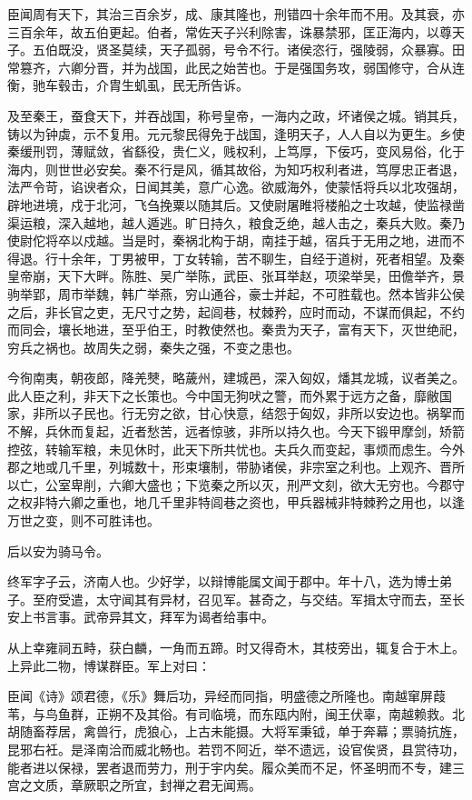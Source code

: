 \documentclass[]{article}
\begin{document}
臣闻周有天下，其治三百余岁，成、康其隆也，刑错四十余年而不用。及其衰，亦三百余年，故五伯更起。伯者，常佐天子兴利除害，诛暴禁邪，匡正海内，以尊天子。五伯既没，贤圣莫续，天子孤弱，号令不行。诸侯恣行，强陵弱，众暴寡。田常篡齐，六卿分晋，并为战国，此民之始苦也。于是强国务攻，弱国修守，合从连衡，驰车毂击，介胄生虮虱，民无所告诉。

及至秦王，蚕食天下，并吞战国，称号皇帝，一海内之政，坏诸侯之城。销其兵，铸以为钟虡，示不复用。元元黎民得免于战国，逢明天子，人人自以为更生。乡使秦缓刑罚，薄赋敛，省繇役，贵仁义，贱权利，上笃厚，下佞巧，变风易俗，化于海内，则世世必安矣。秦不行是风，循其故俗，为知巧权利者进，笃厚忠正者退，法严令苛，谄谀者众，日闻其美，意广心逸。欲威海外，使蒙恬将兵以北攻强胡，辟地进境，戍于北河，飞刍挽粟以随其后。又使尉屠睢将楼船之士攻越，使监禄凿渠运粮，深入越地，越人遁逃。旷日持久，粮食乏绝，越人击之，秦兵大败。秦乃使尉佗将卒以戍越。当是时，秦祸北构于胡，南挂于越，宿兵于无用之地，进而不得退。行十余年，丁男被甲，丁女转输，苦不聊生，自经于道树，死者相望。及秦皇帝崩，天下大畔。陈胜、吴广举陈，武臣、张耳举赵，项梁举吴，田儋举齐，景驹举郢，周市举魏，韩广举燕，穷山通谷，豪士并起，不可胜载也。然本皆非公侯之后，非长官之吏，无尺寸之势，起闾巷，杖棘矜，应时而动，不谋而俱起，不约而同会，壤长地进，至乎伯王，时教使然也。秦贵为天子，富有天下，灭世绝祀，穷兵之祸也。故周失之弱，秦失之强，不变之患也。

今徇南夷，朝夜郎，降羌僰，略薉州，建城邑，深入匈奴，燔其龙城，议者美之。此人臣之利，非天下之长策也。今中国无狗吠之警，而外累于远方之备，靡敝国家，非所以子民也。行无穷之欲，甘心快意，结怨于匈奴，非所以安边也。祸挐而不解，兵休而复起，近者愁苦，远者惊骇，非所以持久也。今天下锻甲摩剑，矫箭控弦，转输军粮，未见休时，此天下所共忧也。夫兵久而变起，事烦而虑生。今外郡之地或几千里，列城数十，形束壤制，带胁诸侯，非宗室之利也。上观齐、晋所以亡，公室卑削，六卿大盛也；下览秦之所以灭，刑严文刻，欲大无穷也。今郡守之权非特六卿之重也，地几千里非特闾巷之资也，甲兵器械非特棘矜之用也，以逢万世之变，则不可胜讳也。

后以安为骑马令。

终军字子云，济南人也。少好学，以辩博能属文闻于郡中。年十八，选为博士弟子。至府受遣，太守闻其有异材，召见军。甚奇之，与交结。军揖太守而去，至长安上书言事。武帝异其文，拜军为谒者给事中。

从上幸雍祠五畤，获白麟，一角而五蹄。时又得奇木，其枝旁出，辄复合于木上。上异此二物，博谋群臣。军上对曰：

臣闻《诗》颂君德，《乐》舞后功，异经而同指，明盛德之所隆也。南越窜屏葭苇，与鸟鱼群，正朔不及其俗。有司临境，而东瓯内附，闽王伏辜，南越赖救。北胡随畜荐居，禽兽行，虎狼心，上古未能摄。大将军秉钺，单于奔幕；票骑抗旌，昆邪右衽。是泽南洽而威北畅也。若罚不阿近，举不遗远，设官俟贤，县赏待功，能者进以保禄，罢者退而劳力，刑于宇内矣。履众美而不足，怀圣明而不专，建三宫之文质，章厥职之所宜，封禅之君无闻焉。
\end{document}
